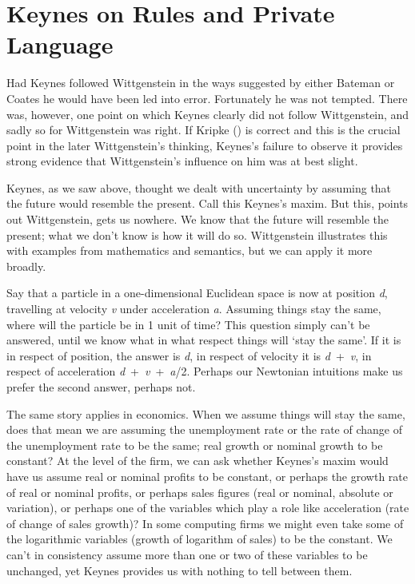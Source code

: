 \documentclass[
  10pt,
  letterpaper,
  DIV=11,
  numbers=noendperiod,
  twoside]{scrartcl}
\begin{document}
\section{Keynes on Rules and Private
Language}\label{keynes-on-rules-and-private-language}

Had Keynes followed Wittgenstein in the ways suggested by either Bateman
or Coates he would have been led into error. Fortunately he was not
tempted. There was, however, one point on which Keynes clearly did not
follow Wittgenstein, and sadly so for Wittgenstein was right. If Kripke
() is correct and this is the crucial
point in the later Wittgenstein's thinking, Keynes's failure to observe
it provides strong evidence that Wittgenstein's influence on him was at
best slight.

Keynes, as we saw above, thought we dealt with uncertainty by assuming
that the future would resemble the present. Call this Keynes's maxim.
But this, points out Wittgenstein, gets us nowhere. We know that the
future will resemble the present; what we don't know is how it will do
so. Wittgenstein illustrates this with examples from mathematics and
semantics, but we can apply it more broadly.

Say that a particle in a one-dimensional Euclidean space is now at
position \emph{d}, travelling at velocity \emph{v} under acceleration
\emph{a}. Assuming things stay the same, where will the particle be in 1
unit of time? This question simply can't be answered, until we know what
in what respect things will `stay the same'. If it is in respect of
position, the answer is \emph{d}, in respect of velocity it is
\emph{d}~+~\emph{v}, in respect of acceleration
\emph{d}~+~\emph{v}~+~\emph{a}/2. Perhaps our Newtonian intuitions make
us prefer the second answer, perhaps not.

The same story applies in economics. When we assume things will stay the
same, does that mean we are assuming the unemployment rate or the rate
of change of the unemployment rate to be the same; real growth or
nominal growth to be constant? At the level of the firm, we can ask
whether Keynes's maxim would have us assume real or nominal profits to
be constant, or perhaps the growth rate of real or nominal profits, or
perhaps sales figures (real or nominal, absolute or variation), or
perhaps one of the variables which play a role like acceleration (rate
of change of sales growth)? In some computing firms we might even take
some of the logarithmic variables (growth of logarithm of sales) to be
the constant. We can't in consistency assume more than one or two of
these variables to be unchanged, yet Keynes provides us with nothing to
tell between them.
\end{document}
